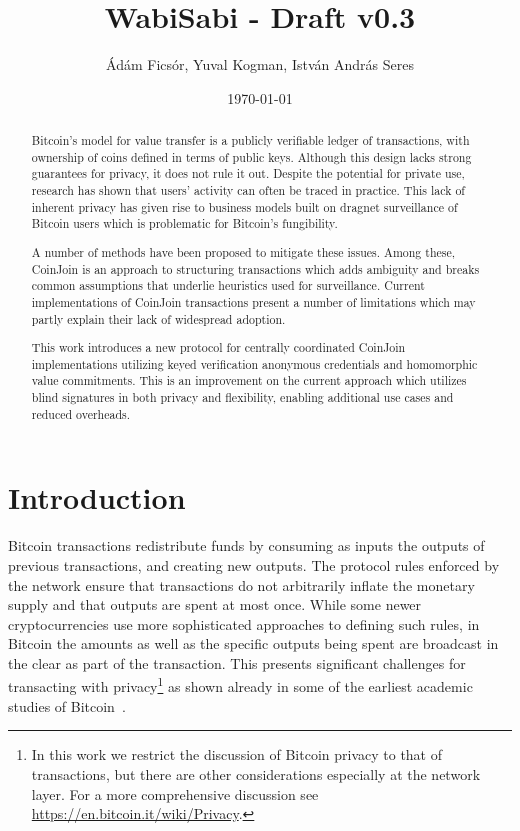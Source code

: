 \documentclass{article}
\title{WabiSabi - Draft v0.3}
\author{Ádám Ficsór, Yuval Kogman, István András Seres}
\date{\today}
\begin{document}
\maketitle

\begin{abstract}
  Bitcoin's model for value transfer is a publicly verifiable ledger of transactions, with ownership of coins defined in terms of public keys. Although this design lacks strong guarantees for privacy, it does not rule it out.
  Despite the potential for private use, research has shown that users' activity can often be traced in practice.
  This lack of inherent privacy has given rise to business models built on dragnet surveillance of Bitcoin users which is problematic for Bitcoin's fungibility.

  A number of methods have been proposed to mitigate these issues. Among these, CoinJoin is an approach to structuring transactions which adds ambiguity and breaks common assumptions that underlie heuristics used for surveillance.
  Current implementations of CoinJoin transactions present a number of limitations which may partly explain their lack of widespread adoption.

  This work introduces a new protocol for centrally coordinated CoinJoin implementations utilizing keyed verification anonymous credentials and homomorphic value commitments. This is an improvement on the current approach which utilizes blind signatures in both privacy and flexibility, enabling additional use cases and reduced overheads.
\end{abstract}

\section{Introduction}

Bitcoin transactions redistribute funds by consuming as inputs the outputs of previous transactions, and creating new outputs. The protocol rules enforced by the network ensure that transactions do not arbitrarily inflate the monetary supply and that outputs are spent at most once. While some newer cryptocurrencies use more sophisticated approaches to defining such rules, in Bitcoin the amounts as well as the specific outputs being spent are broadcast in the clear as part of the transaction. This presents significant challenges for transacting with privacy\footnote{In this work we restrict the discussion of Bitcoin privacy to that of transactions, but there are other considerations especially at the network layer. For a more comprehensive discussion see \url{https://en.bitcoin.it/wiki/Privacy}.} as shown already in some of the earliest academic studies of Bitcoin~\cite{ron2013quantitative,meiklejohn2013fistful,moser2013anonymity}.
\end{document}
